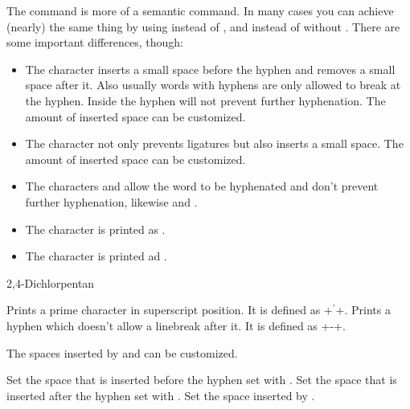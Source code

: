 \documentclass{chemmacros-manual}
\makeatletter
\renewenvironment{commands}
  {%
    \let\command\cnltx@command
    \let\explcommand\cnltx@explcommand
    \cnltxlist
  }
  {\endcnltxlist}
\makeatother
\begin{document}
\begin{example}
  \begin{minipage}{.4\linewidth}
  \end{minipage}
\end{example}

The  command is more of a semantic command.  In many cases you can
achieve (nearly) the same thing by using \cs*{-} instead of \sym{\textbar},
and  instead of \sym{\textasciicircum} without
.  There are some important differences, though:
\begin{itemize}
  \item The character \sym{-} inserts a small space before the hyphen and
    removes a small space after it.  Also usually words with hyphens are only
    allowed to break at the hyphen.  Inside  the hyphen will not
    prevent further hyphenation.  The amount of inserted space can be
    customized.
  \item The character \sym{\textbar} not only prevents ligatures but also
    inserts a small space.  The amount of inserted space can be customized.
  \item The characters \sym{(} and \sym{)} allow the word to be hyphenated and
    don't prevent further hyphenation, likewise \sym{[} and \sym{]}.
  \item {}The character  is printed as .
  \item {}The character \sym{=} is printed ad
    .
\end{itemize}
\begin{example}
  \huge{} \par
  2,4-Dichlorpentan
\end{example}
\begin{commands}
  \command{chemprime}
    Prints a prime character in superscript position.  It is
    defined as \verbcode+\ensuremath{{}^{\prime}}+.
  \command{nonbreakinghyphen}
    Prints a hyphen which doesn't allow a linebreak after
    it.  It is defined as \verbcode+\mbox{-}\nobreak\hspace{0pt}+.
\end{commands}

The spaces inserted by \sym{-} and \sym{\textbar} can be
customized.
\begin{options}
  \Default{.01em}
    Set the space that is inserted before the hyphen set with \sym{-}.
  \Default{-.03em}
    Set the space that is inserted after the hyphen set with \sym{-}.
  \Default{.01em}
    Set the space inserted by \sym{\textbar}.
\end{options}
\end{document}
